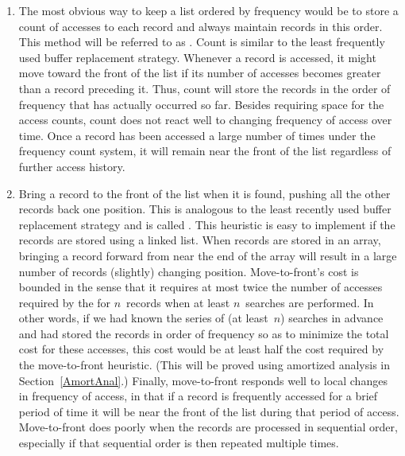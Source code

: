 \begin{enumerate}

\item
The most obvious way to keep a list ordered by frequency would be to
store a count of accesses to each record and always maintain records
in this order.
This method will be referred to as .
Count is similar to the least frequently used buffer replacement
strategy.
Whenever a record is accessed, it might move toward the front of
the list if its number of accesses becomes greater than a record
preceding it.
Thus, count will store the records in the order of frequency
that has actually occurred so far.
Besides requiring space for the access counts, count does not
react well to changing frequency of access over time.
Once a record has been accessed a large number of times under the
frequency count system, it will
remain near the front of the list regardless of further access
history.

\item
{}
Bring a record to the front of the list when it is
found, pushing all the other records back one position.
This is analogous to the least recently used
buffer
replacement strategy and is called
.
This heuristic is easy to implement if the records are stored using a
linked list.
When records are stored in an array, bringing a record forward from
near the end of the array will result in a
large number of records (slightly) changing position.
Move-to-front's cost is bounded in the sense that it requires at most
twice the number of accesses required by the
 for
\(n\)~records when at least \(n\)~searches are performed.
In other words, if we had known the series of (at least~\(n\))
searches in advance and had stored the records in order of frequency
so as to minimize the total cost for these accesses, this cost would
be at least half the cost required by the move-to-front heuristic.
(This will be proved using
amortized analysis
in Section~\ref{AmortAnal}.)
Finally, move-to-front responds well to local changes in frequency of
access, in that if a record is frequently accessed for a brief period
of time it will be near the front of the list during that period of
access.
Move-to-front does poorly when the records are processed in sequential
order, especially if that sequential order is then repeated multiple
times.


\end{enumerate}
